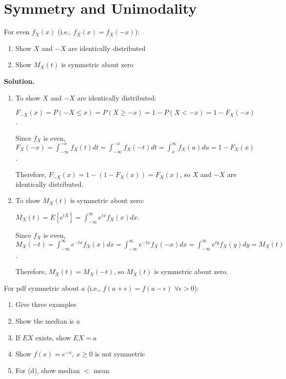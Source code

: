 \section{Symmetry and Unimodality}

\begin{problembox}
For even $f_X(x)$ (i.e., $f_X(x)=f_X(-x)$):
\begin{enumerate}[label=(\alph*)]
    \item Show $X$ and $-X$ are identically distributed
    \item Show $M_X(t)$ is symmetric about zero
\end{enumerate}
\end{problembox}

\noindent\textbf{Solution.}
\begin{enumerate}[label=(\alph*)]
    \item To show $X$ and $-X$ are identically distributed:
    
    $F_{-X}(x) = P(-X \leq x) = P(X \geq -x) = 1 - P(X < -x) = 1 - F_X(-x)$.
    
    Since $f_X$ is even, $F_X(-x) = \int_{-\infty}^{-x} f_X(t)dt = \int_{-\infty}^{-x} f_X(-t)dt = \int_x^{\infty} f_X(u)du = 1 - F_X(x)$.
    
    Therefore, $F_{-X}(x) = 1 - (1 - F_X(x)) = F_X(x)$, so $X$ and $-X$ are identically distributed.
    
    \item To show $M_X(t)$ is symmetric about zero:
    
    $M_X(t) = E[e^{tX}] = \int_{-\infty}^{\infty} e^{tx}f_X(x)dx$.
    
    Since $f_X$ is even, $M_X(-t) = \int_{-\infty}^{\infty} e^{-tx}f_X(x)dx = \int_{-\infty}^{\infty} e^{-tx}f_X(-x)dx = \int_{-\infty}^{\infty} e^{ty}f_X(y)dy = M_X(t)$.
    
    Therefore, $M_X(t) = M_X(-t)$, so $M_X(t)$ is symmetric about zero.
\end{enumerate}

\begin{problembox}
For pdf symmetric about $a$ (i.e., $f(a+\epsilon)=f(a-\epsilon)$ $\forall\epsilon>0$):
\begin{enumerate}[label=(\alph*)]
    \item Give three examples
    \item Show the median is $a$
    \item If $EX$ exists, show $EX=a$
    \item Show $f(x)=e^{-x}$, $x\geq0$ is not symmetric
    \item For (d), show median $<$ mean
\end{enumerate}
\end{problembox}

